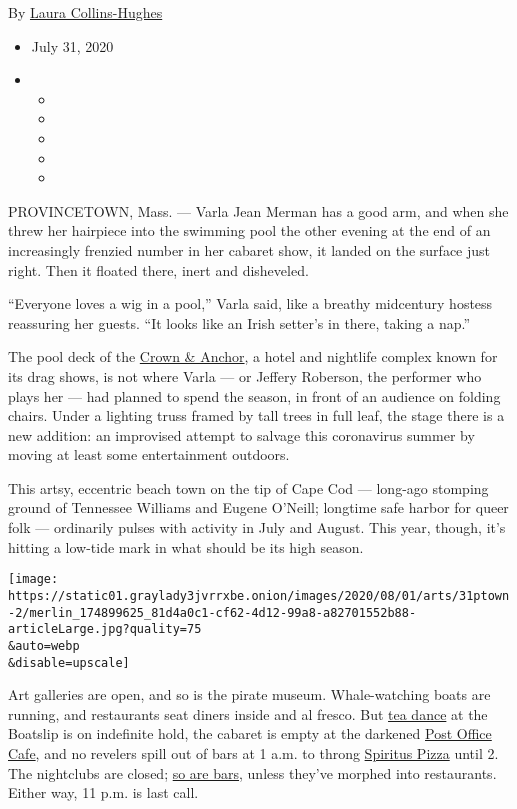 By
\href{https://www.nytimes3xbfgragh.onion/by/laura-collins-hughes}{Laura
Collins-Hughes}

\begin{itemize}
\item
  July 31, 2020
\item
  \begin{itemize}
  \item
  \item
  \item
  \item
  \item
  \end{itemize}
\end{itemize}

PROVINCETOWN, Mass. --- Varla Jean Merman has a good arm, and when she
threw her hairpiece into the swimming pool the other evening at the end
of an increasingly frenzied number in her cabaret show, it landed on the
surface just right. Then it floated there, inert and disheveled.

``Everyone loves a wig in a pool,'' Varla said, like a breathy
midcentury hostess reassuring her guests. ``It looks like an Irish
setter's in there, taking a nap.''

The pool deck of the
\href{https://onlyatthecrown.com/entertainment}{Crown \& Anchor}, a
hotel and nightlife complex known for its drag shows, is not where Varla
--- or Jeffery Roberson, the performer who plays her --- had planned to
spend the season, in front of an audience on folding chairs. Under a
lighting truss framed by tall trees in full leaf, the stage there is a
new addition: an improvised attempt to salvage this coronavirus summer
by moving at least some entertainment outdoors.

This artsy, eccentric beach town on the tip of Cape Cod --- long-ago
stomping ground of Tennessee Williams and Eugene O'Neill; longtime safe
harbor for queer folk --- ordinarily pulses with activity in July and
August. This year, though, it's hitting a low-tide mark in what should
be its high season.

\texttt{[image: https://static01.graylady3jvrrxbe.onion/images/2020/08/01/arts/31ptown-2/merlin\_174899625\_81d4a0c1-cf62-4d12-99a8-a82701552b88-articleLarge.jpg?quality=75\\\&auto=webp\\\&disable=upscale]}

Art galleries are open, and so is the pirate museum. Whale-watching
boats are running, and restaurants seat diners inside and al fresco. But
\href{https://theboatslip.com/tea-dance}{tea dance} at the Boatslip is
on indefinite hold, the cabaret is empty at the darkened
\href{https://www.postofficecabaret.com}{Post Office Cafe}, and no
revelers spill out of bars at 1 a.m. to throng
\href{http://spirituspizza.com}{Spiritus Pizza} until 2. The nightclubs
are closed;
\href{https://provincetownindependent.org/featured/2020/07/09/last-call-at-11-p-m-in-provincetown/}{so
are bars}, unless they've morphed into restaurants. Either way, 11 p.m.
is last call.

